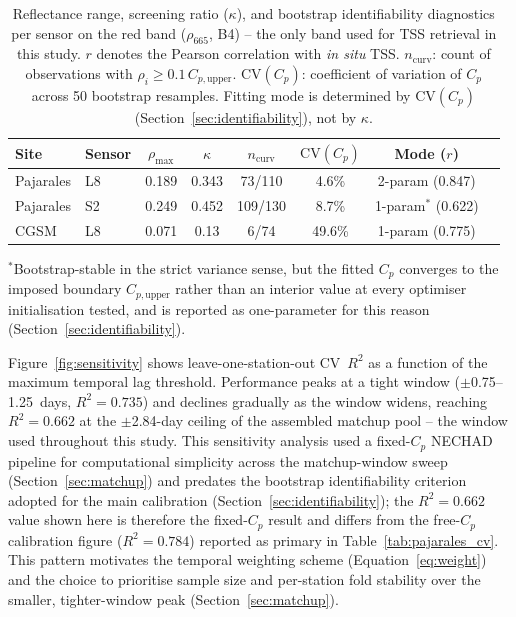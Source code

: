 \documentclass[remotesensing,article,submit,pdftex,moreauthors]{Definitions/mdpi}
\begin{document}
\begin{table}[ht]
\centering
\caption{Reflectance range, screening ratio ($\kappa$), and bootstrap
identifiability diagnostics per sensor on the red band ($\rho_{665}$,
B4) -- the only band used for TSS retrieval in this study. $r$ denotes
the Pearson correlation with \textit{in situ} TSS. $n_{\text{curv}}$:
count of observations with $\rho_i \geq 0.1\,C_{p,\text{upper}}$.
$\mathrm{CV}(C_p)$: coefficient of variation of $C_p$ across 50
bootstrap resamples. Fitting mode is determined by $\mathrm{CV}(C_p)$
(Section~\ref{sec:identifiability}), not by $\kappa$.}
\label{tab:identifiability}
\small
\begin{tabular}{llcccccc}
\toprule
Site & Sensor & $\rho_{\max}$ & $\kappa$ & $n_{\text{curv}}$ & $\mathrm{CV}(C_p)$ & Mode ($r$) \\
\midrule
Pajarales & L8 & 0.189 & 0.343 & 73/110 & 4.6\% & 2-param (0.847) \\
Pajarales & S2 & 0.249 & 0.452 & 109/130 & 8.7\% & 1-param$^*$ (0.622) \\
CGSM      & L8 & 0.071 & 0.13  & 6/74 & 49.6\% & 1-param (0.775)  \\
\bottomrule
\end{tabular}
\end{table}
{\small $^*$Bootstrap-stable in the strict variance sense, but the
fitted $C_p$ converges to the imposed boundary $C_{p,\text{upper}}$
rather than an interior value at every optimiser initialisation
tested, and is reported as one-parameter for this reason
(Section~\ref{sec:identifiability}).}
 
Figure~\ref{fig:sensitivity} shows leave-one-station-out CV~$R^2$ as a
function of the maximum temporal lag threshold. Performance peaks at a
tight window ($\pm$0.75--1.25~days, $R^2 = 0.735$) and declines
gradually as the window widens, reaching $R^2 = 0.662$ at the
$\pm$2.84-day ceiling of the assembled matchup pool -- the window used
throughout this study. This sensitivity analysis used a fixed-$C_p$
NECHAD pipeline for computational simplicity across the matchup-window
sweep (Section~\ref{sec:matchup}) and predates the bootstrap
identifiability criterion adopted for the main calibration
(Section~\ref{sec:identifiability}); the $R^2 = 0.662$ value shown here
is therefore the fixed-$C_p$ result and differs from the free-$C_p$
calibration figure ($R^2 = 0.784$) reported as primary in
Table~\ref{tab:pajarales_cv}. This pattern motivates the temporal
weighting scheme (Equation~\ref{eq:weight}) and the choice to
prioritise sample size and per-station fold stability over the
smaller, tighter-window peak (Section~\ref{sec:matchup}).
 
\end{document}
